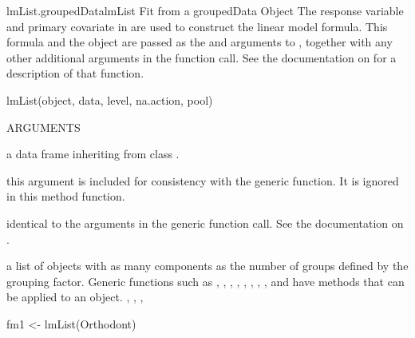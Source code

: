 \documentclass[pdftex]{article} \usepackage{url,graphicx}
\begin{document}
\begin{Helpfile}{lmList.groupedData}{lmList Fit from a groupedData Object}
The response variable and primary covariate in 
are used to construct the linear model formula. This formula
and the  object are passed as the  and
 arguments to , together with any other
additional arguments in the function call. See the documentation on
 for a description of that function.
\begin{Example}
lmList(object, data, level, na.action, pool)
\end{Example}
\begin{Argument}{ARGUMENTS}
\item[\Co{object:}]
a data frame inheriting from class .
\item[\Co{data:}]
this argument is included for consistency with the generic
function. It is ignored in this method function.
\item[\Co{other arguments:}]
identical to the arguments in the generic
function call. See the documentation on .
\end{Argument}
a list of  objects with as many components as the number of
groups defined by the grouping factor. Generic functions such as
, , , ,
, , , ,
and  have methods that can be applied to an 
object.
, , ,
\need 15pt
\vspace{-16pt}
\begin{Example}
fm1 <- lmList(Orthodont)
\end{Example}
\end{Helpfile}
\end{document}
